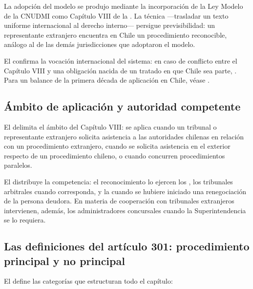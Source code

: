 La adopción del modelo se produjo mediante la incorporación de la Ley Modelo de la CNUDMI
\parencite{ley-modelo-uncitral} como Capítulo VIII de la \LIR{}. La técnica ---trasladar un
texto uniforme internacional al derecho interno--- persigue previsibilidad: un representante
extranjero encuentra en Chile un procedimiento reconocible, análogo al de las demás
jurisdicciones que adoptaron el modelo.

El  confirma la vocación internacional del sistema: en caso de conflicto entre el
Capítulo VIII y una obligación nacida de un tratado en que Chile sea parte, . Para un balance de la primera década de aplicación en Chile, véase
\textcite{doc-diez-anos-uncitral}.

\bloqueNormativo

\subsection{Ámbito de aplicación y autoridad competente}

El  delimita el ámbito del Capítulo VIII: se aplica cuando un tribunal o
representante extranjero solicita asistencia a las autoridades chilenas en relación con un
procedimiento extranjero, cuando se solicita asistencia en el exterior respecto de un
procedimiento chileno, o cuando concurren procedimientos paralelos.

El  distribuye la competencia: el reconocimiento lo ejercen los , los tribunales arbitrales cuando corresponda, y la \superir{} cuando
se hubiere iniciado una renegociación de la persona deudora. En materia de cooperación con
tribunales extranjeros intervienen, además, los administradores concursales cuando la
Superintendencia se lo requiera.

\subsection{Las definiciones del artículo 301: procedimiento principal y no principal}

El  define las categorías que estructuran todo el capítulo:

